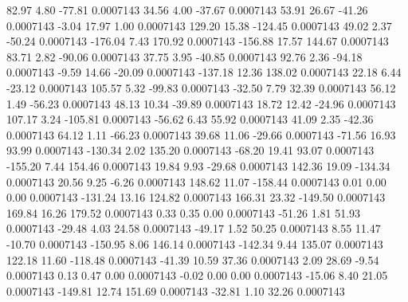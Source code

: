        82.97        4.80      -77.81     0.0007143
       34.56        4.00      -37.67     0.0007143
       53.91       26.67      -41.26     0.0007143
       -3.04       17.97        1.00     0.0007143
      129.20       15.38     -124.45     0.0007143
       49.02        2.37      -50.24     0.0007143
     -176.04        7.43      170.92     0.0007143
     -156.88       17.57      144.67     0.0007143
       83.71        2.82      -90.06     0.0007143
       37.75        3.95      -40.85     0.0007143
       92.76        2.36      -94.18     0.0007143
       -9.59       14.66      -20.09     0.0007143
     -137.18       12.36      138.02     0.0007143
       22.18        6.44      -23.12     0.0007143
      105.57        5.32      -99.83     0.0007143
      -32.50        7.79       32.39     0.0007143
       56.12        1.49      -56.23     0.0007143
       48.13       10.34      -39.89     0.0007143
       18.72       12.42      -24.96     0.0007143
      107.17        3.24     -105.81     0.0007143
      -56.62        6.43       55.92     0.0007143
       41.09        2.35      -42.36     0.0007143
       64.12        1.11      -66.23     0.0007143
       39.68       11.06      -29.66     0.0007143
      -71.56       16.93       93.99     0.0007143
     -130.34        2.02      135.20     0.0007143
      -68.20       19.41       93.07     0.0007143
     -155.20        7.44      154.46     0.0007143
       19.84        9.93      -29.68     0.0007143
      142.36       19.09     -134.34     0.0007143
       20.56        9.25       -6.26     0.0007143
      148.62       11.07     -158.44     0.0007143
        0.01        0.00        0.00     0.0007143
     -131.24       13.16      124.82     0.0007143
      166.31       23.32     -149.50     0.0007143
      169.84       16.26      179.52     0.0007143
        0.33        0.35        0.00     0.0007143
      -51.26        1.81       51.93     0.0007143
      -29.48        4.03       24.58     0.0007143
      -49.17        1.52       50.25     0.0007143
        8.55       11.47      -10.70     0.0007143
     -150.95        8.06      146.14     0.0007143
     -142.34        9.44      135.07     0.0007143
      122.18       11.60     -118.48     0.0007143
      -41.39       10.59       37.36     0.0007143
        2.09       28.69       -9.54     0.0007143
        0.13        0.47        0.00     0.0007143
       -0.02        0.00        0.00     0.0007143
      -15.06        8.40       21.05     0.0007143
     -149.81       12.74      151.69     0.0007143
      -32.81        1.10       32.26     0.0007143
